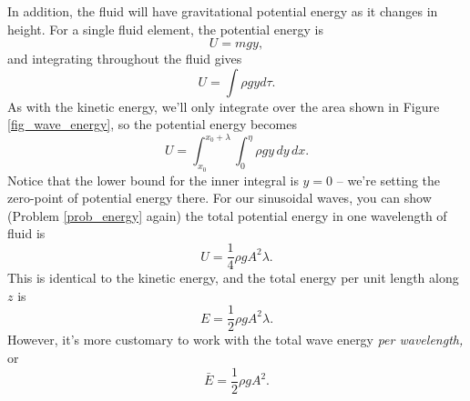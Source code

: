 In addition, the fluid will have gravitational potential energy as it changes in height.  For a single fluid element, the potential energy is
\[
U = mgy,
\]
and integrating throughout the fluid gives
\begin{equation}
U = \int \rho g y d\tau.
\end{equation}
As with the kinetic energy, we'll only integrate over the area shown in Figure \ref{fig_wave_energy}, so the potential energy becomes
\begin{equation}
U = \int_{x_0}^{x_0 + \lambda} \int_{0}^{\eta} \rho g y \, dy \, dx.
\end{equation}
Notice that the lower bound for the inner integral is $y=0$ -- we're setting the zero-point of potential energy there.  For our sinusoidal waves, you can show (Problem \ref{prob_energy} again) the total potential energy in one wavelength of fluid is
\begin{equation}
\label{eq_pot_energy_wave}
U = \frac{1}{4} \rho g A^2 \lambda. 
\end{equation}
This is identical to the kinetic energy, and the total energy per unit length along $z$ is
\[
E = \frac{1}{2} \rho g A^2 \lambda.
\]
However, it's more customary to work with the total wave energy \emph{per wavelength,} or
\begin{equation}
\label{eq_wave_energy}
\bar{E} = \frac{1}{2} \rho g A^2.
\end{equation} 

